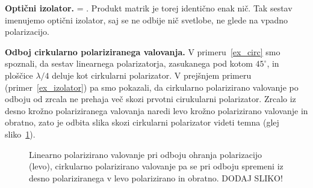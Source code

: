 \begin{example}{\bf Optični izolator.}
\left[\begin{array}{cc}
1 & 0 \\
0 & -1\\
\end{array}\right]
\cdot 
\left[\begin{array}{cc}
1 &  1 \\
i & i\\
\end{array}\right] = 
\left[\!\!\begin{array}{cc}
0 & 0\\
0 & 0\\
\end{array}\right]\!\!.
\label{eq:03_63}
\eeq
Produkt matrik je torej identično enak nič. Tak sestav imenujemo
optični izolator, saj se ne odbije nič svetlobe, ne glede na vpadno 
polarizacijo. 
\end{example}

\begin{example}{\bf Odboj cirkularno polariziranega valovanja.}
V primeru~\ref{ex_circ} smo spoznali, da sestav linearnega polarizatorja, 
zasukanega pod kotom $45^\circ$, in ploščice $\lambda/4$ deluje
kot cirkularni polarizator. V prejšnjem primeru (primer~\ref{ex_izolator})
pa smo pokazali, da cirkularno polarizirano valovanje po odboju 
od zrcala ne prehaja več skozi prvotni cirukularni 
polarizator. Zrcalo iz desno krožno polariziranega valovanja naredi
levo krožno polarizirano valovanje in obratno, zato je odbita
slika skozi cirkularni polarizator videti 
temna (glej sliko~\ref{fig:03_CirkularniOdboj}). 
\begin{figure}[h!]
\centering
\caption{Linearno polarizirano valovanje pri odboju ohranja polarizacijo (levo), 
cirkularno polarizirano valovanje pa se pri odboju spremeni iz desno polariziranega
v levo polarizirano in obratno. DODAJ SLIKO!}
\label{fig:03_CirkularniOdboj}
\end{figure}
\end{example}

